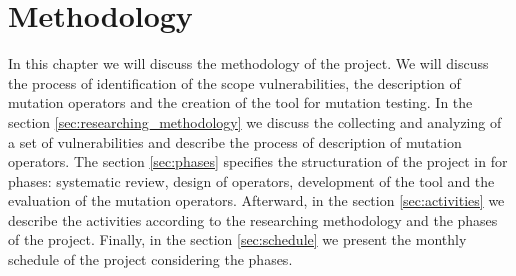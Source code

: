 \chapter{Methodology}

In this chapter we will discuss the methodology of the project. We will discuss the process of identification of the scope vulnerabilities, the description of mutation operators and the creation of the tool for mutation testing.  In the section \ref{sec:researching_methodology} we discuss the collecting and analyzing of a set of vulnerabilities and describe the process of description of mutation operators. The section \ref{sec:phases} specifies the structuration of the project in for phases: systematic review, design of operators, development of the tool and the evaluation of the mutation operators. Afterward, in the section \ref{sec:activities} we describe the activities according to the researching methodology and the phases of the project. Finally, in the section \ref{sec:schedule} we present the monthly schedule of the project considering the phases.
